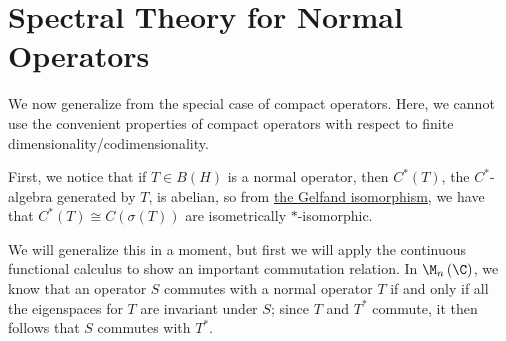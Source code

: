 \documentclass[10pt]{mypackage}
\begin{document}
\section{Spectral Theory for Normal Operators}%
We now generalize from the special case of compact operators. Here, we cannot use the convenient properties of compact operators with respect to finite dimensionality/codimensionality.

First, we notice that if $T\in B\left( H \right)$ is a normal operator, then $C^{\ast}\left( T \right)$, the $C^{\ast}$-algebra generated by $T$, is abelian, so from \href{https://ai-bearing.github.io/Classes_and_Homework/After\%20College/Other\%20Notes/continuous_functional_calculus.pdf}{the Gelfand isomorphism}, we have that $C^{\ast}\left( T \right)\cong C\left(\sigma(T)\right)$ are isometrically $\ast$-isomorphic.

We will generalize this in a moment, but first we will apply the continuous functional calculus to show an important commutation relation. In $\M_n\left(\C\right)$, we know that an operator $S$ commutes with a normal operator $T$ if and only if all the eigenspaces for $T$ are invariant under $S$; since $T$ and $T^{\ast}$ commute, it then follows that $S$ commutes with $T^{\ast}$.
\end{document}
